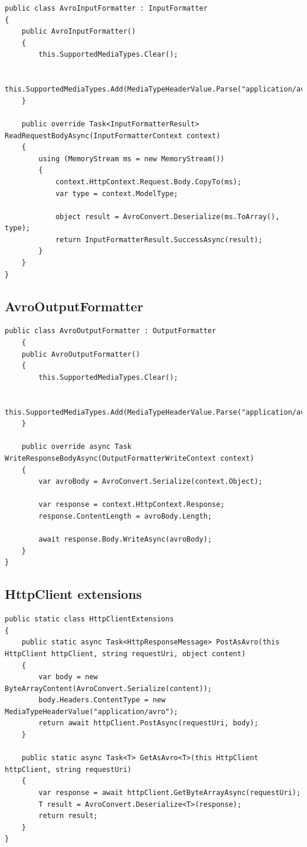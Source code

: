 \documentclass[]{article}
\begin{document}
\begin{lstlisting}[language={[Sharp]C}, label={Script}]
public class AvroInputFormatter : InputFormatter
{
	public AvroInputFormatter()
	{
		this.SupportedMediaTypes.Clear();
		
		this.SupportedMediaTypes.Add(MediaTypeHeaderValue.Parse("application/avro"));
	}
	
	public override Task<InputFormatterResult> ReadRequestBodyAsync(InputFormatterContext context)
	{
		using (MemoryStream ms = new MemoryStream())
		{
			context.HttpContext.Request.Body.CopyTo(ms);
			var type = context.ModelType;
			
			object result = AvroConvert.Deserialize(ms.ToArray(), type);
			return InputFormatterResult.SuccessAsync(result);
		}
	}
}
\end{lstlisting}

\subsection{AvroOutputFormatter}

\begin{lstlisting}[language={[Sharp]C}, label={Script}]
public class AvroOutputFormatter : OutputFormatter
	{
	public AvroOutputFormatter()
	{
		this.SupportedMediaTypes.Clear();
		
		this.SupportedMediaTypes.Add(MediaTypeHeaderValue.Parse("application/avro"));
	}
	
	public override async Task WriteResponseBodyAsync(OutputFormatterWriteContext context)
	{
		var avroBody = AvroConvert.Serialize(context.Object);
		
		var response = context.HttpContext.Response;
		response.ContentLength = avroBody.Length;
		
		await response.Body.WriteAsync(avroBody);
	}
}
\end{lstlisting}

\subsection{HttpClient extensions}

\begin{lstlisting}[language={[Sharp]C}, label={Script}]
public static class HttpClientExtensions
{
	public static async Task<HttpResponseMessage> PostAsAvro(this HttpClient httpClient, string requestUri, object content)
	{
		var body = new ByteArrayContent(AvroConvert.Serialize(content));
		body.Headers.ContentType = new MediaTypeHeaderValue("application/avro");
		return await httpClient.PostAsync(requestUri, body);
	}
	
	public static async Task<T> GetAsAvro<T>(this HttpClient httpClient, string requestUri)
	{
		var response = await httpClient.GetByteArrayAsync(requestUri);
		T result = AvroConvert.Deserialize<T>(response);
		return result;
	}
}
\end{lstlisting}
\end{document}
